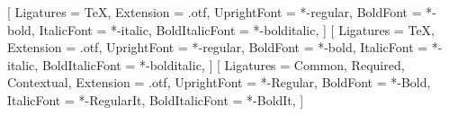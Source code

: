 %
%
\RequirePackage{fontspec}
\setmainfont{texgyrepagella}[%
  Ligatures = TeX,
  Extension = .otf,
  UprightFont = *-regular,
  BoldFont = *-bold,
  ItalicFont = *-italic,
  BoldItalicFont = *-bolditalic,
]
\setsansfont{texgyreheros}[%
  Ligatures = TeX,
  Extension = .otf,
  UprightFont = *-regular,
  BoldFont = *-bold,
  ItalicFont = *-italic,
  BoldItalicFont = *-bolditalic,
]
\setmonofont{SourceCodePro}[%
  Ligatures = {Common, Required, Contextual},
  Extension = .otf,
  UprightFont = *-Regular,
  BoldFont = *-Bold,
  ItalicFont = *-RegularIt,
  BoldItalicFont = *-BoldIt,
]
%
\RequirePackage{amsmath}
\RequirePackage{unicode-math}
